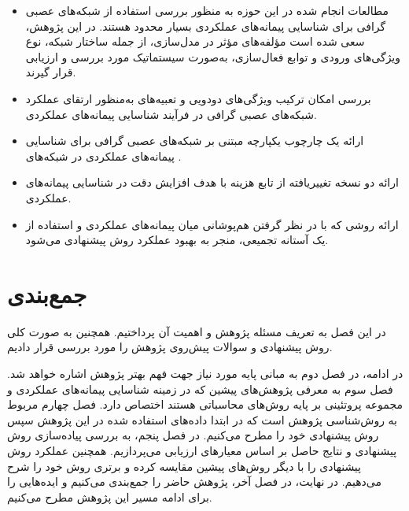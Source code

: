 \begin{itemize}
	
	\item مطالعات انجام شده در این حوزه به منظور بررسی استفاده از شبکه‌های عصبی گرافی برای شناسایی پیمانه‌های عملکردی  بسیار محدود  هستند. در این پژوهش، سعی شده است مؤلفه‌های مؤثر در مدل‌سازی، از جمله ساختار شبکه، نوع ویژگی‌های ورودی و توابع فعال‌سازی، به‌صورت سیستماتیک مورد بررسی و ارزیابی قرار ‌گیرند.
	
	
	\item بررسی امکان ترکیب ویژگی‌های دودویی و تعبیه‌های   به‌منظور ارتقای عملکرد شبکه‌های عصبی گرافی در فرآیند شناسایی پیمانه‌های عملکردی.
	
	\item ارائه یک چارچوب یکپارچه مبتنی بر شبکه‌های عصبی گرافی برای شناسایی پیمانه‌های عملکردی در شبکه‌های .
	
	\item ارائه دو نسخه تغییر‌یافته از تابع هزینه  با هدف افزایش دقت در شناسایی پیمانه‌های عملکردی.
	
	\item ارائه روشی که با در نظر گرفتن هم‌پوشانی میان پیمانه‌های عملکردی و استفاده از یک آستانه تجمیعی، منجر به بهبود عملکرد روش پیشنهادی می‌شود.
	
\end{itemize}


\section{جمع‌بندی}
در این فصل به تعریف مسئله‌ پژوهش و اهمیت آن پرداختیم. همچنین به صورت کلی روش پیشنهادی و سوالات پیش‌‌روی پژوهش را مورد بررسی قرار دادیم.

در ادامه، در فصل دوم به مبانی پایه‌ مورد نیاز جهت فهم بهتر پژوهش اشاره خواهد شد. فصل سوم به معرفی پژوهش‌های پیشین که در زمینه شناسایی پیمانه‌های عملکردی و مجموعه پروتئینی بر پایه روش‌های محاسباتی هستند اختصاص دارد. فصل چهارم مربوط به روش‌شناسی پژوهش است که در ابتدا داده‌های استفاده شده در این پژوهش سپس روش پیشنهادی خود را مطرح می‌کنیم. در فصل پنجم، به بررسی پیاده‌سازی روش پیشنهادی و نتایج حاصل بر اساس معیار‌های ارزیابی می‌پردازیم. همچنین عملکرد روش پیشنهادی را با دیگر روش‌های پیشین مقایسه کرده و برتری روش خود را شرح می‌دهیم. در نهایت، در فصل آخر، پژوهش حاضر را جمع‌بندی می‌کنیم و ایده‌هایی را برای ادامه‌ مسیر این پژوهش مطرح می‌کنیم.